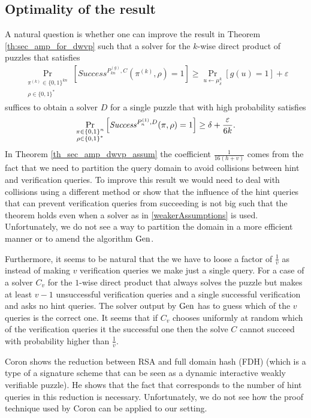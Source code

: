 \subsection{Optimality of the result}
\label{st:discussion}
A natural question is whether one can improve the result in Theorem \ref{th:sec_amp_for_dwvp} such that a solver
for the $k$-wise direct product of puzzles that satisfies
\begin{align}
    \label{weakerAssumptions}
    \underset{\substack{\pi^{(k)} \in \{0,1\}^{kn} \\ \rho \in \{0,1\}^{*}}}{\Pr}\left[\mathit{Success}^{P_{kn}^{(g)}, C}(\pi^{(k)}, \rho) = 1\right]
    \geq \underset{u \leftarrow \mu_\delta^k}{\Pr}[g(u) = 1] + \varepsilon
\end{align}
suffices to obtain a solver $D$ for a single puzzle that with high probability satisfies
  \begin{align}
    \underset{\substack{\pi \in \{0,1\}^{n} \\ \rho \in \{0,1\}^{*}}}
    {\Pr}\left[\operatorname{\mathit{Success}}^{P_{n}^{(1)},D}(\pi, \rho) = 1\right] \geq \delta + \frac{\varepsilon}{6k}.
  \end{align}
In Theorem \ref{th_sec_amp_dwvp_assum} the coefficient $\frac{1}{16(h+v)}$ comes from the fact that we need to partition the query domain
to avoid collisions between hint and verification queries.
To improve this result we would need to deal with collisions using a different method or show that the influence of the hint queries that can prevent
verification queries from succeeding is not big such that the theorem holds even when a solver as in \ref{weakerAssumptions} is used.
Unfortunately, we do not see a way to partition the domain in a more efficient manner or to amend the algorithm $\operatorname{\text{Gen}}$.

Furthermore, it seems to be natural that the we have to loose a factor of $\frac{1}{v}$ as instead of making $v$ verification queries we make just a single query.
For a case of a solver $C_v$ for the $1$-wise direct product that always solves the puzzle but makes at least $v-1$ unsuccessful verification
queries and a single successful verification and asks no hint queries.
The solver output by $\operatorname{\text{Gen}}$ has to guess which of the $v$ queries is the correct one.
It seems that if $C_v$ chooses uniformly at random which of the verification queries it the successful one then the solve $C$ cannot succeed with
probability higher than $\frac{1}{v}$.

Coron \cite{coron2000exact, coron2002optimal} shows the reduction between RSA and full domain hash (FDH)
(which is a type of a signature scheme that can be seen as a dynamic interactive weakly verifiable puzzle).
He shows that the fact that corresponds to the number of hint queries in this reduction is necessary.
Unfortunately, we do not see how the proof technique used by Coron can be applied to our setting.

